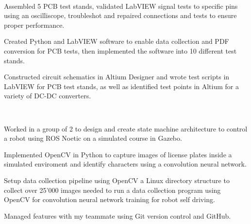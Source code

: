 \documentclass[a4paper]{MagicalCV}
\begin{document}
\begin{minipage}[t]{0.69\textwidth} 


 \\
\vspace{\topsep} %
\begin{tightemize}
\item Assembled 5 PCB test stands, validated LabVIEW signal tests to specific pins using an oscilliscope, troubleshot and repaired connections and tests to ensure proper performance.
\item Created Python and LabVIEW software to enable data collection and PDF conversion for PCB tests, then implemented the software into 10 different test stands. 
\item Constructed circuit schematics in Altium Designer and wrote test scripts in LabVIEW for PCB test stands, as well as identified test points in Altium for a variety of DC-DC converters.  
\end{tightemize}


 \\
\begin{tightemize}
        \item Worked in a group of 2 to design and create state machine architecture to control a robot using ROS Noetic on a simulated course in Gazebo.
        \item Implemented OpenCV in Python to capture images of license plates inside a simulated enviroment and identify characters using a convolution neural network.
        \item Setup data collection pipeline using OpenCV a Linux directory structure to collect over 25'000 images needed to run a data collection program using OpenCV for convolution neural network training for robot self driving.
        \item Managed features with my teammate using Git version control and GitHub.
\end{tightemize}
\sectionsep


\end{minipage}
\end{document}
